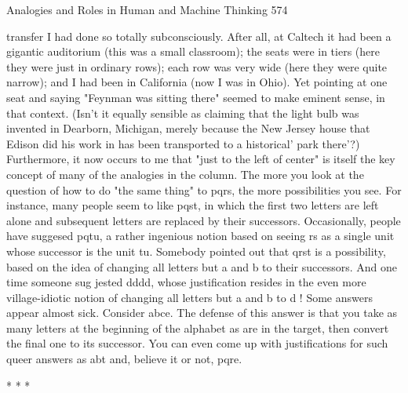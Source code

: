 Analogies and Roles in Human and Machine Thinking                                      574

transfer I had done so totally subconsciously. After all, at Caltech it had been a
gigantic auditorium (this was a small classroom); the seats were in tiers (here they
were just in ordinary rows); each row was very wide (here they were quite narrow);
and I had been in California (now I was in Ohio). Yet pointing at one seat and saying
"Feynman was sitting there" seemed to make eminent sense, in that context. (Isn't it
equally sensible as claiming that the light bulb was invented in Dearborn, Michigan,
merely because the New Jersey house that Edison did his work in has been
transported to a historical' park there'?) Furthermore, it now occurs to me that "just to
the left of center" is itself the key concept of many of the analogies in the column.
         The more you look at the question of how to do "the same thing" to pqrs, the
more possibilities you see. For instance, many people seem to like pqst, in which the
first two letters are left alone and subsequent letters are replaced by their successors.
Occasionally, people have suggesed pqtu, a rather ingenious notion based on seeing rs
as a single unit whose successor is the unit tu. Somebody pointed out that qrst is a
possibility, based on the idea of changing all letters but a and b to their successors.
And one time someone sug jested dddd, whose justification resides in the even more
village-idiotic notion of changing all letters but a and b to d !
         Some answers appear almost sick. Consider abce. The defense of this answer
is that you take as many letters at the beginning of the alphabet as are in the target,
then convert the final one to its successor. You can even come up with justifications
for such queer answers as abt and, believe it or not, pqre.

                                       *   *   *

